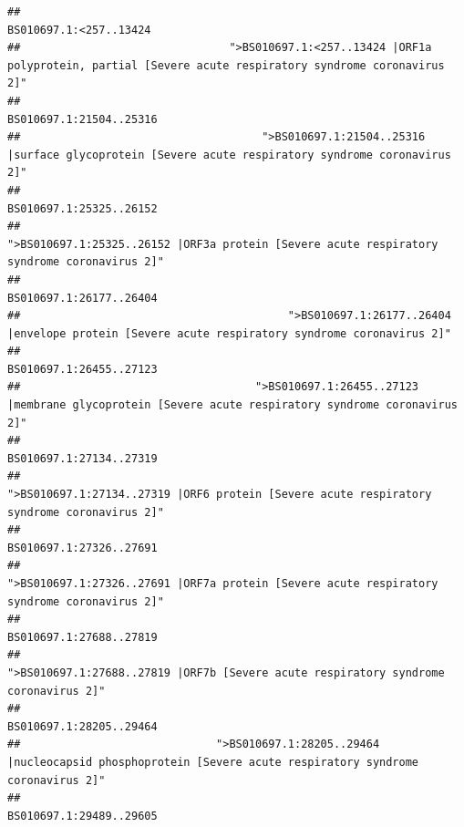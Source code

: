 \documentclass[
]{article}
\begin{document}
\begin{verbatim}
##                                                                                                                 BS010697.1:<257..13424 
##                                ">BS010697.1:<257..13424 |ORF1a polyprotein, partial [Severe acute respiratory syndrome coronavirus 2]" 
##                                                                                                                BS010697.1:21504..25316 
##                                     ">BS010697.1:21504..25316 |surface glycoprotein [Severe acute respiratory syndrome coronavirus 2]" 
##                                                                                                                BS010697.1:25325..26152 
##                                            ">BS010697.1:25325..26152 |ORF3a protein [Severe acute respiratory syndrome coronavirus 2]" 
##                                                                                                                BS010697.1:26177..26404 
##                                         ">BS010697.1:26177..26404 |envelope protein [Severe acute respiratory syndrome coronavirus 2]" 
##                                                                                                                BS010697.1:26455..27123 
##                                    ">BS010697.1:26455..27123 |membrane glycoprotein [Severe acute respiratory syndrome coronavirus 2]" 
##                                                                                                                BS010697.1:27134..27319 
##                                             ">BS010697.1:27134..27319 |ORF6 protein [Severe acute respiratory syndrome coronavirus 2]" 
##                                                                                                                BS010697.1:27326..27691 
##                                            ">BS010697.1:27326..27691 |ORF7a protein [Severe acute respiratory syndrome coronavirus 2]" 
##                                                                                                                BS010697.1:27688..27819 
##                                                    ">BS010697.1:27688..27819 |ORF7b [Severe acute respiratory syndrome coronavirus 2]" 
##                                                                                                                BS010697.1:28205..29464 
##                              ">BS010697.1:28205..29464 |nucleocapsid phosphoprotein [Severe acute respiratory syndrome coronavirus 2]" 
##                                                                                                                BS010697.1:29489..29605 

\end{verbatim}
\end{document}
